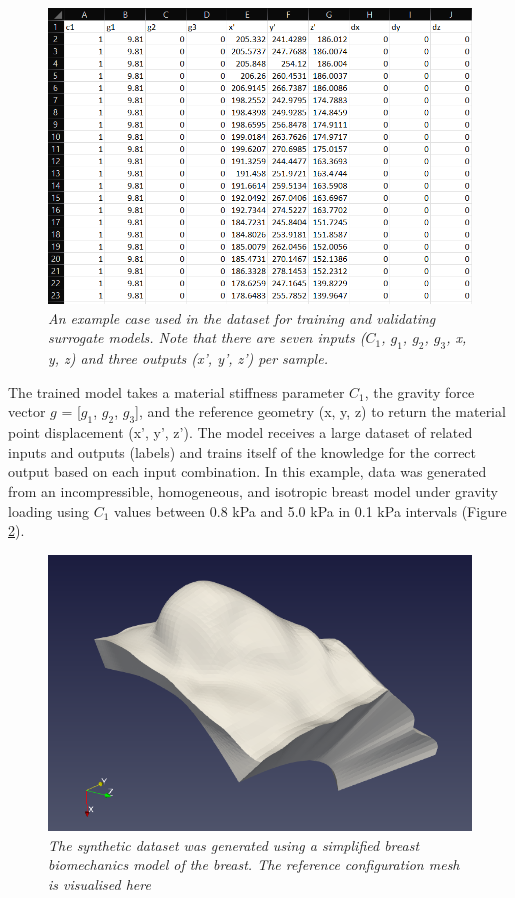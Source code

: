 \documentclass[11pt]{article}
\begin{document}
\begin{figure}
\centering
\includegraphics[scale=0.7]{Images/breast/training_data_structure.png}
\caption{\textit{\label{fig3}An example case used in the dataset for training and validating surrogate models. Note that there are seven inputs ($C_{1}$, $g_{1}$, $g_{2}$, $g_{3}$, x, y, z) and three outputs (x', y', z') per sample.}}
\end{figure}

The trained model takes a material stiffness parameter $C_{1}$, the gravity force vector $g$ = [$g_{1}$, $g_{2}$, $g_{3}$], and the reference geometry (x, y, z) to return the material point displacement (x', y', z'). The model receives a large dataset of related inputs and outputs (labels) and trains itself of the knowledge for the correct output based on each input combination. In this example, data was generated from an incompressible, homogeneous, and isotropic breast model under gravity loading using $C_{1}$ values between 0.8 kPa and 5.0 kPa in 0.1 kPa intervals (Figure \ref{fig4}).

\begin{figure}
\centering
\includegraphics[scale=0.7]{Images/breast/breast_visualisation.png}
\caption{\textit{\label{fig4}The synthetic dataset was generated using a simplified breast biomechanics model of the breast. The reference configuration mesh is visualised here}} 
\end{figure}
\end{document}
